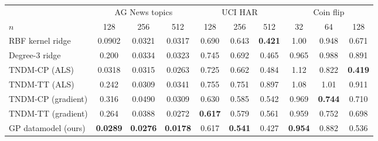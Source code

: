 \begin{tabular}{@{}lccccccccc@{}}
\toprule
& \multicolumn{3}{c}{AG News topics} & \multicolumn{3}{c}{UCI HAR} & \multicolumn{3}{c}{Coin flip} \\
\cmidrule(lr){2-4}\cmidrule(lr){5-7}\cmidrule(lr){8-10}
$n$ & 128 & 256 & 512 & 128 & 256 & 512 & 32 & 64 & 128 \\
\midrule
RBF kernel ridge & 0.0902 & 0.0321 & 0.0317 & 0.690 & 0.643 & \textbf{0.421} & 1.00 & 0.948 & 0.671 \\
Degree-3 ridge & 0.200 & 0.0334 & 0.0323 & 0.745 & 0.692 & 0.465 & 0.965 & 0.988 & 0.891 \\
TNDM-CP (ALS) & 0.0318 & 0.0315 & 0.0263 & 0.725 & 0.662 & 0.484 & 1.12 & 0.822 & \textbf{0.419} \\
TNDM-TT (ALS) & 0.242 & 0.0309 & 0.0341 & 0.755 & 0.751 & 0.897 & 1.08 & 1.01 & 0.911 \\
TNDM-CP (gradient) & 0.316 & 0.0490 & 0.0309 & 0.630 & 0.585 & 0.542 & 0.969 & \textbf{0.744} & 0.710 \\
TNDM-TT (gradient) & 0.264 & 0.0388 & 0.0272 & \textbf{0.617} & 0.579 & 0.561 & 0.959 & 0.752 & 0.698 \\
GP datamodel (ours) & \textbf{0.0289} & \textbf{0.0276} & \textbf{0.0178} & 0.617 & \textbf{0.541} & 0.427 & \textbf{0.954} & 0.882 & 0.536 \\
\bottomrule
\end{tabular}
